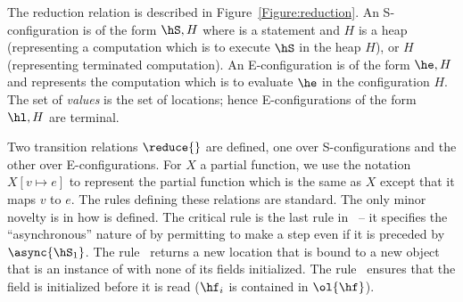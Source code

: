 The reduction relation is described in
Figure~\ref{Figure:reduction}. An S-configuration is of the form
$\hS,H$ where \hS{} is a statement and $H$ is a heap (representing a
computation which is to execute $\hS$ in the heap $H$), or $H$
(representing terminated computation). An
E-configuration is of the form $\he,H$ and represents the
computation which is to evaluate $\he$ in the configuration $H$. The
set of {\em values} is the set of locations; hence E-configurations of
the form $\hl,H$ are terminal.

Two transition relations $\reduce{}$ are defined, one over S-configurations and
the other over E-configurations.
For $X$ a partial function, we use the notation $X[v \mapsto
  e]$ to represent the partial function which is the same as $X$
except that it maps $v$ to $e$.
The rules defining these relations are
standard.
The only minor novelty is in how \hasync{} is defined. The
critical rule is the last rule in~  -- it specifies the
``asynchronous'' nature of \hasync{} by permitting \hS{} to make a step
even if it is preceded by $\async{\hS_1}$.
%
The rule~ returns a new location that is bound to a new
object that is an instance of \hC{} with none of its fields initialized.
%
The rule~ ensures that the field is initialized before it is
read ($\hf_i$ is contained in $\ol{\hf}$).

